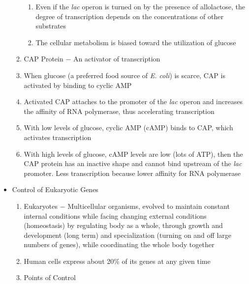 \documentclass[12pt]{article}
\begin{document}
\begin{itemize}
\begin{enumerate}
\begin{enumerate}
          \item Even if the \textit{lac} operon is turned on by the presence of allolactose, the degree of transcription depends on the concentrations of other substrates

          \item The cellular metabolism is biased toward the utilization of glucose

        \end{enumerate}

      \item CAP Protein $-$ An activator of transcription

      \item When glucose (a preferred food source of \textit{E. coli}) is scarce, CAP is activated by binding to cyclic AMP

      \item Activated CAP attaches to the promoter of the \textit{lac} operon and increases the affinity of RNA polymerase, thus accelerating transcription

      \item With low levels of glucose, cyclic AMP (cAMP) binds to CAP, which activates transcription

      \item With high levels of glucose, cAMP levels are low (lots of ATP), then the CAP protein has an inactive shape and cannot bind upstream of the \textit{lac} promoter. Less transcription because lower affinity for RNA polymerase

    \end{enumerate}

  \item Control of Eukaryotic Genes

    \begin{enumerate}

      \item Eukaryotes $-$ Multicellular organisms, evolved to maintain constant internal conditions while facing changing external conditions (homeostasis) by regulating body as a whole, through growth and development (long term) and specialization (turning on and off large numbers of genes), while coordinating the whole body together

      \item Human cells express about 20\% of its genes at any given time

      \item Points of Control


\end{enumerate}
\end{itemize}
\end{document}
